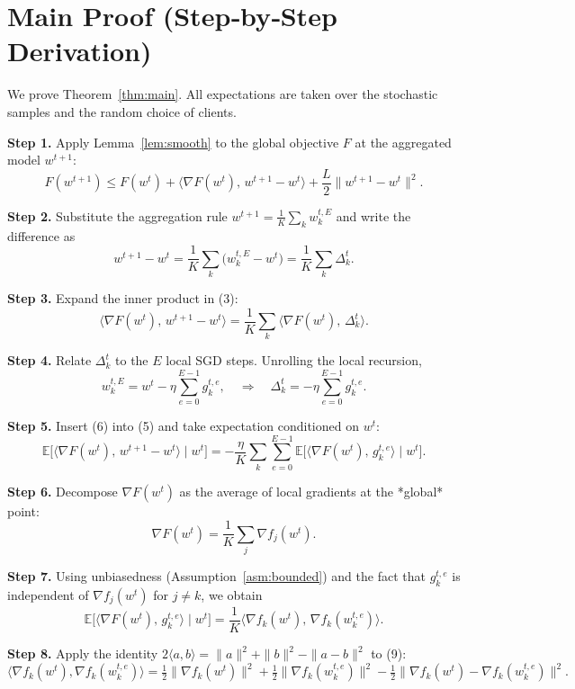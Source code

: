\documentclass{article}
\begin{document}
\section*{Main Proof (Step‑by‑Step Derivation)}
We prove Theorem~\ref{thm:main}. All expectations are taken over the stochastic
samples and the random choice of clients.

\noindent\textbf{Step 1.}  Apply Lemma~\ref{lem:smooth} to the global
objective $F$ at the aggregated model $w^{t+1}$:
\[
F(w^{t+1})\le F(w^{t})+\big\langle\nabla F(w^{t}),\,w^{t+1}-w^{t}\big\rangle
+\frac{L}{2}\|w^{t+1}-w^{t}\|^{2}.
\tag{3}
\]

\noindent\textbf{Step 2.}  Substitute the aggregation rule
$w^{t+1}= \frac1K\sum_{k} w_{k}^{t,E}$ and write the difference as
\[
w^{t+1}-w^{t}= \frac1K\sum_{k}\big(w_{k}^{t,E}-w^{t}\big)
= \frac1K\sum_{k}\Delta_{k}^{t}.
\tag{4}
\]

\noindent\textbf{Step 3.}  Expand the inner product in (3):
\[
\big\langle\nabla F(w^{t}),\,w^{t+1}-w^{t}\big\rangle
= \frac1K\sum_{k}\big\langle\nabla F(w^{t}),\,\Delta_{k}^{t}\big\rangle.
\tag{5}
\]

\noindent\textbf{Step 4.}  Relate $\Delta_{k}^{t}$ to the $E$ local SGD steps.
Unrolling the local recursion,
\[
w_{k}^{t,E}= w^{t}-\eta\sum_{e=0}^{E-1} g_{k}^{t,e},
\quad\Longrightarrow\quad
\Delta_{k}^{t}= -\eta\sum_{e=0}^{E-1} g_{k}^{t,e}.
\tag{6}
\]

\noindent\textbf{Step 5.}  Insert (6) into (5) and take expectation conditioned on $w^{t}$:
\[
\mathbb{E}\!\big[\big\langle\nabla F(w^{t}),\,w^{t+1}-w^{t}\big\rangle\mid w^{t}\big]
= -\frac{\eta}{K}\sum_{k}\sum_{e=0}^{E-1}
\mathbb{E}\!\big[\langle\nabla F(w^{t}),\,g_{k}^{t,e}\rangle\mid w^{t}\big].
\tag{7}
\]

\noindent\textbf{Step 6.}  Decompose $\nabla F(w^{t})$ as the average of local
gradients at the *global* point:
\[
\nabla F(w^{t}) = \frac1K\sum_{j}\nabla f_j(w^{t}).
\tag{8}
\]

\noindent\textbf{Step 7.}  Using unbiasedness (Assumption~\ref{asm:bounded}) and
the fact that $g_{k}^{t,e}$ is independent of $\nabla f_j(w^{t})$ for $j\neq k$,
we obtain
\[
\mathbb{E}\!\big[\langle\nabla F(w^{t}),\,g_{k}^{t,e}\rangle\mid w^{t}\big]
= \frac1K\langle\nabla f_k(w^{t}),\,\nabla f_k(w_{k}^{t,e})\rangle.
\tag{9}
\]

\noindent\textbf{Step 8.}  Apply the identity
$2\langle a,b\rangle = \|a\|^{2}+\|b\|^{2}-\|a-b\|^{2}$ to (9):
\[
\langle\nabla f_k(w^{t}),\nabla f_k(w_{k}^{t,e})\rangle
= \tfrac12\|\nabla f_k(w^{t})\|^{2}
+\tfrac12\|\nabla f_k(w_{k}^{t,e})\|^{2}
-\tfrac12\|\nabla f_k(w^{t})-\nabla f_k(w_{k}^{t,e})\|^{2}.
\tag{10}
\]
\end{document}
